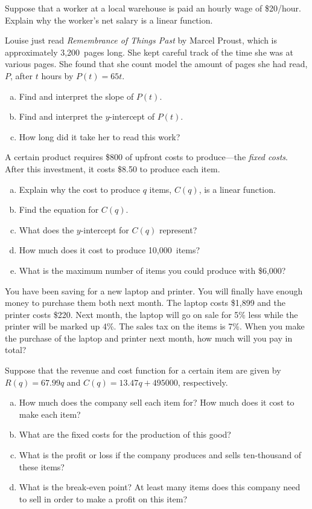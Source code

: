 \documentclass[11pt,letterpaper]{article}
\begin{document}
\prob Suppose that a worker at a local warehouse is paid an hourly wage of \$20/hour. Explain why the worker's net salary is a linear function. \pspace


\prob Louise just read \textit{Remembrance of Things Past} by Marcel Proust, which is approximately 3,200~pages long. She kept careful track of the time she was at various pages. She found that she count model the amount of pages she had read, $P$, after $t$ hours by $P(t)= 65t$.
	\begin{enumerate}[(a)]
	\item Find and interpret the slope of $P(t)$.
	\item Find and interpret the $y$-intercept of $P(t)$.
	\item How long did it take her to read this work?
	\end{enumerate} \pspace


\prob A certain product requires \$800 of upfront costs to produce---the \textit{fixed costs}. After this investment, it costs \$8.50 to produce each item. 
	\begin{enumerate}[(a)]
	\item Explain why the cost to produce $q$ items, $C(q)$, is a linear function.
	\item Find the equation for $C(q)$.
	\item What does the $y$-intercept for $C(q)$ represent?
	\item How much does it cost to produce 10,000~items?
	\item What is the maximum number of items you could produce with \$6,000?
	\end{enumerate} \pspace


\prob You have been saving for a new laptop and printer. You will finally have enough money to purchase them both next month. The laptop costs \$1,899 and the printer costs \$220. Next month, the laptop will go on sale for 5\% less while the printer will be marked up 4\%. The sales tax on the items is 7\%. When you make the purchase of the laptop and printer next month, how much will you pay in total? \pspace


\prob Suppose that the revenue and cost function for a certain item are given by $R(q)= 67.99q$ and $C(q)= 13.47q + 495000$, respectively. 
	\begin{enumerate}[(a)]
	\item How much does the company sell each item for? How much does it cost to make each item?
	\item What are the fixed costs for the production of this good?
	\item What is the profit or loss if the company produces and sells ten-thousand of these items?
	\item What is the break-even point? At least many items does this company need to sell in order to make a profit on this item?
	\end{enumerate} \pspace
\end{document}
